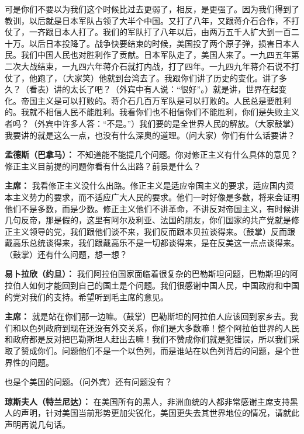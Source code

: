 \begin{list}{}
可是你们不要以为我们这个时候比过去更弱了，相反，是更强了。因为我们得到了教训，以后就是日本军队占领了大半个中国。又打了八年，又跟蒋介石合作，不打仗了，一齐跟日本人打了。我们的军队打了八年以后，由两万五千人扩大到一百二十万。以后日本投降了。战争快要结束的时候，美国投了两个原子弹，损害日本人民。我们中国人民也对胜利作了贡献。日本军队走了，美国人来了。一九四五年第二次大战结束，一九四六年蒋介石就打内战，打了四年。一九四九年蒋介石说不打仗了，他跑了，（大家笑）他就到台湾去了。我跟你们讲了历史的变化。讲了多久？（看表）讲的太长了吧？（外宾中有人说：“很好”。）就是讲，世界在起变化。帝国主义是可以打败的。蒋介石几百万军队是可以打败的。人民总是要胜利的。我就不相信人民不能胜利。我看你们也不相信你们不能胜利，你们是失败主义者吗？（外宾中许多人答：“不是。”）我们要的是全世界人民的解放。（大家鼓掌）我要讲的就是这么一点，也没有什么深奥的道理。（问大家）你们有什么话要讲？

\item[\textbf{孟德斯（巴拿马）：}] 不知道能不能提几个问题。你对修正主义有什么具体的意见？修正主义目前提的问题你看有什么出路？前景是什么？

\item[\textbf{主席：}] 我看修正主义没什么出路。修正主义是适应帝国主义的要求，适应国内资本主义势力的要求，而不适应广大人民的要求。他们一时好像是多数，将来会证明他们不是多数，而是少数。修正主义他们不讲革命，不讲反对帝国主义，有时候讲几句反帝，那是假的，这里有阿尔及利亚、法国的朋友，你们国家的共产党就是修正主义领导的党，我们跟他们谈不来，我们反而跟本贝拉谈得来。（鼓掌）反而跟戴高乐总统谈得来，我们跟戴高乐不是一切都谈得来，是在反美这一点点谈得来。（鼓掌）还有什么问题，想一想？

\item[\textbf{易卜拉欣（约旦）：}] 我们阿拉伯国家面临着很复杂的巴勒斯坦问题，巴勒斯坦的阿拉伯人如何才能回到自己的国土是个问题。我们很感谢中国人民，中国政府和中国的党对我们的支持。希望听到毛主席的意见。

\item[\textbf{主席：}] 就是站在你们那一边嘛。（鼓掌）巴勒斯坦的阿拉伯人应该回到家乡去。我们和以色列政府到现在还没有外交关系，你们是大多数嘛！整个阿拉伯世界的人民和政府都是反对把巴勒斯坦人赶出去嘛！我们不赞成你们就是犯错误，所以我们采取了赞成你们。问题他们不是一个以色列，而是谁站在以色列背后的问题，是个世界性的问题。

也是个美国的问题。（问外宾）还有问题没有？

\item[\textbf{琼斯夫人（特兰尼达）：}] 在美国所有的黑人，非洲血统的人都非常感谢主席支持黑人的声明，针对美国当前形势更加尖锐化，美国更失去其世界地位的情况，请就此声明再说几句话。


\end{list}
